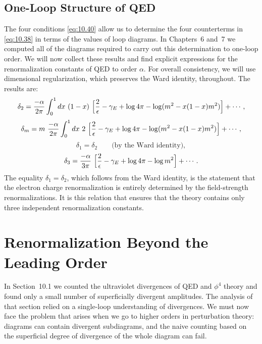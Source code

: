 \subsection{One-Loop Structure of QED}

The four conditions \eqref{eq:10.40} allow us to determine the four
counterterms in \eqref{eq:10.38} in terms of the values of loop diagrams.  In
Chapters~6 and~7 we computed all of the diagrams required to carry out this
determination to one-loop order.  We will now collect these results and find
explicit expressions for the renormalization constants of QED to order
$\alpha$.  For overall consistency, we will use dimensional regularization,
which preserves the Ward identity, throughout.  The results are:
\begin{equation}
  \delta_2 = \frac{-\alpha}{2\pi}\int_0^1 dx\ (1-x)\ \Bigl[
    \frac{2}{\epsilon} - \gamma_E + \log 4\pi - \log(m^2-x(1-x)m^2) \Bigr]
    + \cdots ,
  \label{eq:10.41}
\end{equation}
\begin{equation}
  \delta_m = m\ \frac{-\alpha}{2\pi}\int_0^1 dx\ 2\ \Bigl[
    \frac{2}{\epsilon} - \gamma_E + \log 4\pi - \log(m^2-x(1-x)m^2) \Bigr]
    + \cdots ,
  \label{eq:10.42}
\end{equation}
\begin{equation}
  \delta_1 = \delta_2 \qquad \text{(by the Ward identity)},
  \label{eq:10.43}
\end{equation}
\begin{equation}
  \delta_3 = \frac{-\alpha}{3\pi}\ \Bigl[ \frac{2}{\epsilon} - \gamma_E
    + \log 4\pi - \log m^2 \Bigr] + \cdots .
  \label{eq:10.44}
\end{equation}
The equality $\delta_1 = \delta_2$, which follows from the Ward identity, is
the statement that the electron charge renormalization is entirely determined
by the field-strength renormalizations.  It is this relation that ensures that
the theory contains only three independent renormalization constants.

\section{Renormalization Beyond the Leading Order}

In Section~10.1 we counted the ultraviolet divergences of QED and $\phi^4$
theory and found only a small number of superficially divergent amplitudes.
The analysis of that section relied on a single-loop understanding of
divergences.  We must now face the problem that arises when we go to higher
orders in perturbation theory: diagrams can contain divergent subdiagrams,
and the naive counting based on the superficial degree of divergence of the
whole diagram can fail.

